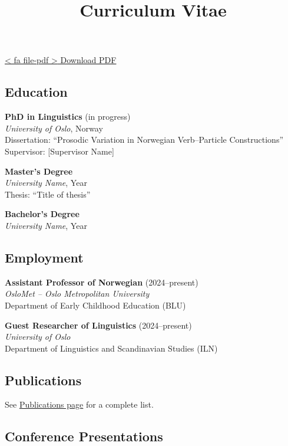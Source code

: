 \documentclass[
]{article}
\title{Curriculum Vitae}
\author{}
\date{}
\begin{document}
\maketitle

\href{cv.pdf}{{{< fa file-pdf >}} Download PDF}

\subsection{Education}\label{education}

\textbf{PhD in Linguistics} (in progress)\\
\emph{University of Oslo}, Norway\\
Dissertation: ``Prosodic Variation in Norwegian Verb--Particle
Constructions''\\
Supervisor: {[}Supervisor Name{]}

\textbf{Master's Degree}\\
\emph{University Name}, Year\\
Thesis: ``Title of thesis''

\textbf{Bachelor's Degree}\\
\emph{University Name}, Year

\subsection{Employment}\label{employment}

\textbf{Assistant Professor of Norwegian} (2024--present)\\
\emph{OsloMet -- Oslo Metropolitan University}\\
Department of Early Childhood Education (BLU)

\textbf{Guest Researcher of Linguistics} (2024--present)\\
\emph{University of Oslo}\\
Department of Linguistics and Scandinavian Studies (ILN)

\subsection{Publications}\label{publications}

See \href{../publications/index.qmd}{Publications page} for a complete
list.

\subsection{Conference Presentations}\label{conference-presentations}
\end{document}
